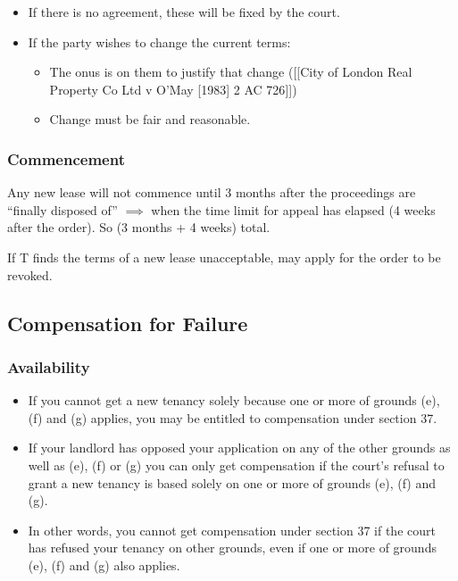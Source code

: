 \documentclass[
]{article}
\providecommand{\tightlist}{%
  \setlength{\itemsep}{0pt}\setlength{\parskip}{0pt}}
\begin{document}
\begin{itemize}
\tightlist
\item
  If there is no agreement, these will be fixed by the court.
\item
  If the party wishes to change the current terms:

  \begin{itemize}
  \tightlist
  \item
    The onus is on them to justify that change ({[}{[}City of London
    Real Property Co Ltd v O'May {[}1983{]} 2 AC 726{]}{]})
  \item
    Change must be fair and reasonable.
  \end{itemize}
\end{itemize}

\hypertarget{commencement-1}{%
\subsubsection{Commencement}\label{commencement-1}}

Any new lease will not commence until 3 months after the proceedings are
``finally disposed of'' \(\implies\) when the time limit for appeal has
elapsed (4 weeks after the order). So (3 months + 4 weeks) total.

If T finds the terms of a new lease unacceptable, may apply for the
order to be revoked.

\hypertarget{compensation-for-failure}{%
\subsection{Compensation for Failure}\label{compensation-for-failure}}

\hypertarget{availability}{%
\subsubsection{Availability}\label{availability}}

\begin{itemize}
\tightlist
\item
  If you cannot get a new tenancy solely because one or more of grounds
  (e), (f) and (g) applies, you may be entitled to compensation under
  section 37.
\item
  If your landlord has opposed your application on any of the other
  grounds as well as (e), (f) or (g) you can only get compensation if
  the court's refusal to grant a new tenancy is based solely on one or
  more of grounds (e), (f) and (g).
\item
  In other words, you cannot get compensation under section 37 if the
  court has refused your tenancy on other grounds, even if one or more
  of grounds (e), (f) and (g) also applies.
\end{itemize}
\end{document}
